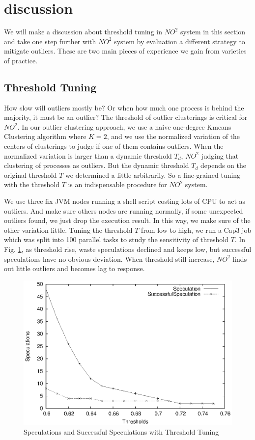 \section{discussion}

We will make a discussion about threshold tuning in $NO^2$ system in this section and take one step further with $NO^2$ system by evaluation a different strategy to mitigate outliers. These are two main pieces of experience we gain from varieties of practice.

\subsection{Threshold Tuning}

How slow will outliers mostly be? Or when how much one process is behind the majority, it must be an outlier? The threshold of outlier clusterings is critical for $NO^2$. In our outlier clustering approach, we use a naive one-degree Kmeans Clustering algorithm where $K = 2$, and we use the normalized variation of the centers of clusterings to judge if one of them contains outliers. When the normalized variation is larger than a dynamic threshold $T_d$, $NO^2$ judging that clustering of processes as outliers. But the dynamic threshold $T_d$ depends on the original threshold $T$ we determined a little arbitrarily. So a fine-grained tuning with the threshold $T$ is an indispensable procedure for $NO^2$ system.

We use three fix JVM nodes running a shell script costing lots of CPU to act as outliers. And make sure others nodes are running normally, if some unexpected outliers found, we just drop the execution result. In this way, we make sure of the other variation little. Tuning the threshold $T$ from low to high, we run a Cap3 job which was split into 100 parallel tasks to study the sensitivity of threshold $T$. In Fig. \ref{figure:thresholdtuning}, as threshold rise, waste speculations declined and keeps low, but successful speculations have no obvious deviation. When threshold still increase, $NO^2$ finds out little outliers and becomes lag to response.

\begin{figure}
\centering
\includegraphics[width=0.9\columnwidth]{figures/threshold&speculation.eps}
\caption{Speculations and Successful Speculations with Threshold Tuning}
\label{figure:thresholdtuning}
\end{figure}

